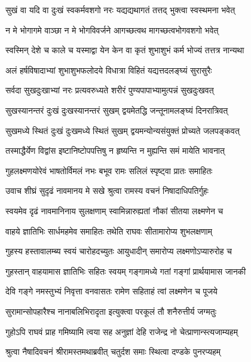 \twolineshloka
{सुखं वा यदि वा दुःखं स्वकर्मवशगो नरः}
{यद्यद्यथागतं तत्तद् भुक्त्वा स्वस्थमना भवेत्} %

\twolineshloka
{न मे भोगागमे वाञ्छा न मे भोगविवर्जने}
{आगच्छत्वथ मागच्छत्वभोगवशगो भवेत्} %

\twolineshloka
{स्वस्मिन् देशे च काले च यस्माद्वा येन केन वा}
{कृतं शुभाशुभं कर्म भोज्यं तत्तत्र नान्यथा} %

\twolineshloka
{अलं हर्षविषादाभ्यां शुभाशुभफलोदये}
{विधात्रा विहितं यद्यत्तदलङ्घ्यं सुरासुरैः} %

\twolineshloka
{सर्वदा सुखदुःखाभ्यां नरः प्रत्यवरुध्यते}
{शरीरं पुण्यपापाभ्यामुत्पन्नं सुखदुःखवत्} %

\twolineshloka
{सुखस्यानन्तरं दुःखं दुःखस्यानन्तरं सुखम्}
{द्वयमेतद्धि जन्तूनामलङ्घ्यं दिनरात्रिवत्} %

\twolineshloka
{सुखमध्ये स्थितं दुःखं दुःखमध्ये स्थितं सुखम्}
{द्वयमन्योन्यसंयुक्तं प्रोच्यते जलपङ्कवत्} %

\twolineshloka
{तस्माद्धैर्येण विद्वांस इष्टानिष्टोपपत्तिषु}
{न हृष्यन्ति न मुह्यन्ति समं मायेति भावनात्} %

\twolineshloka
{गुहलक्ष्मणयोरेवं भाषतोर्विमलं नभः}
{बभूव रामः सलिलं स्पृष्ट्वा प्रातः समाहितः} %

\twolineshloka
{उवाच शीघ्रं सुदृढं नावमानय मे सखे}
{श्रुत्वा रामस्य वचनं निषादाधिपतिर्गुहः} %

\twolineshloka
{स्वयमेव दृढं नावमानिनाय सुलक्षणाम्}
{स्वामिन्नारुह्यतां नौकां सीतया लक्ष्मणेन च} %

\twolineshloka
{वाहये ज्ञातिभिः सार्धमहमेव समाहितः}
{तथेति राघवः सीतामारोप्य शुभलक्षणाम्} %

\twolineshloka
{गुहस्य हस्तावालम्ब्य स्वयं चारोहदच्युतः}
{आयुधादीन् समारोप्य लक्ष्मणोऽप्यारुरोह च} %

\twolineshloka
{गुहस्तान् वाहयामास ज्ञातिभिः सहितः स्वयम्}
{गङ्गामध्ये गतां गङ्गां प्रार्थयामास जानकी} %

\twolineshloka
{देवि गङ्गे नमस्तुभ्यं निवृत्ता वनवासतः}
{रामेण सहिताहं त्वां लक्ष्मणेन च पूजये} %

\twolineshloka
{सुरामान्सोपहारैश्च नानाबलिभिरादृता}
{इत्युक्त्वा परकूलं तौ शनैरुत्तीर्य जग्मतुः} %

\twolineshloka
{गुहोऽपि राघवं प्राह गमिष्यामि त्वया सह}
{अनुज्ञां देहि राजेन्द्र नो चेत्प्राणान्स्त्यजाम्यहम्} %

\twolineshloka
{श्रुत्वा नैषादिवचनं श्रीरामस्तमथाब्रवीत्}
{चतुर्दश समाः स्थित्वा दण्डके पुनरप्यहम्} %

